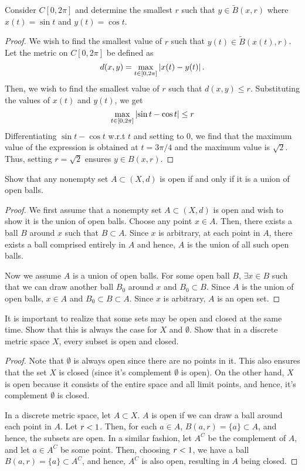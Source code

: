 \begin{question}
    Consider $C[0,2\pi]$ and determine the smallest $r$ such that $y \in \tilde{B}(x,r)$ where $x(t) = \sin t$ and $y(t) = \cos t$.
    \label{section1.3-3}
\end{question}
\begin{proof}
    We wish to find the smallest value of $r$ such that $y(t) \in \tilde{B}(x(t) , r)$. Let the metric on $C[0,2\pi]$ be defined as
    \[d(x,y) = \max_{t \in [0,2\pi]} \left\lvert x(t) - y(t) \right\rvert.\]
    Then, we wish to find the smallest value of $r$ such that $d(x,y) \leq r$. Substituting the values of $x(t)$ and $y(t)$, we get
    \[\max_{t \in [0,2\pi]} \left\lvert \sin t - \cos t \right\rvert \leq r\]
    Differentiating $\sin t - \cos t$ w.r.t $t$ and setting to $0$, we find that the maximum value of the expression is obtained at $t = 3\pi/4$ and the maximum value is $\sqrt{2}$. Thus, setting $r = \sqrt{2}$ ensures $y \in B(x , r)$.
\end{proof}

\begin{question}
    Show that any nonempty set $A \subset (X,d)$ is open if and only if it is a union of open balls.
\label{section1.3-4}
\end{question}
\begin{proof}
    We first assume that a nonempty set $A \subset (X,d)$ is open and wish to show it is the union of open balls. Choose any point $x \in A$. Then, there exists a ball $B$ around $x$ such that $B \subset A$. Since $x$ is arbitrary, at each point in $A$, there exists a ball comprised entirely in $A$ and hence, $A$ is the union of all such open balls. 
    
    Now we assume $A$ is a union of open balls. For some open ball $B$, $\exists x \in B$ such that we can draw another ball $B_0$ around $x$ and $B_0 \subset B$. Since $A$ is the union of open balls, $x \in A$ and $B_0 \subset B \subset A$. Since $x$ is arbitrary, $A$ is an open set.
\end{proof}

\begin{question}
    It is important to realize that some sets may be open and closed at the same time. Show that this is always the case for $X$ and $\emptyset.$ Show that in a discrete metric space $X$, every subset is open and closed.
    \label{section1.3-5}
\end{question}
\begin{proof}
    Note that $\emptyset$ is always open since there are no points in  it. This also ensures that the set $X$ is closed (since it's complement $\emptyset$ is open). On the other hand, $X$ is open because it consists of the entire space and all limit points, and hence, it's complement $\emptyset$ is closed.

    In a discrete metric space, let $A \subset X$. $A$ is open if we can draw a ball around each point in $A$. Let $r < 1$. Then, for each $a \in A$, $B(a,r) = \{a\} \subset A$, and hence, the subsets are open. In a similar fashion, let $A^C$ be the complement of $A$, and let $a \in A^C$ be some point. Then, choosing $r < 1$, we have a ball $B(a,r) = \{a\} \subset A^C$, and hence, $A^C$ is also open, resulting in $A$ being closed.
\end{proof} 

